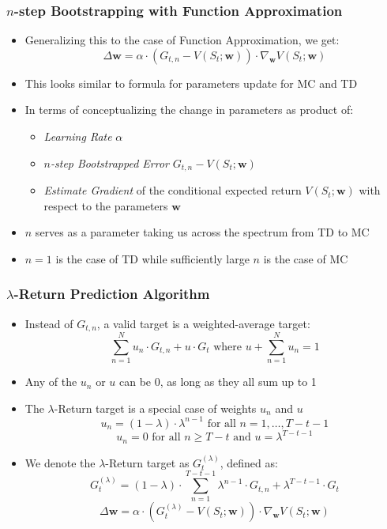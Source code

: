 \documentclass[handout]{beamer}
\begin{document}
\begin{frame}
\frametitle{$n$-step Bootstrapping with Function Approximation}
\pause
\begin{itemize}[<+->]
\item Generalizing this to the case of Function Approximation, we get:
$$\Delta \bm{w} = \alpha \cdot (G_{t,n} - V(S_t; \bm{w})) \cdot \nabla_{\bm{w}} V(S_t;\bm{w})$$
\item This looks similar to formula for parameters update for MC and TD
\item In terms of conceptualizing the change in parameters as product of:
\begin{itemize}[<+->]
\item {\em Learning Rate} $\alpha$
\item {\em $n$-step Bootstrapped Error} $G_{t,n} - V(S_t; \bm{w})$
\item {\em Estimate Gradient} of the conditional expected return $V(S_t;\bm{w})$ with respect to the parameters $\bm{w}$
\end{itemize}
\item $n$ serves as a parameter taking us across the spectrum from TD to MC
\item $n=1$ is the case of TD while sufficiently large $n$ is the case of MC
\end{itemize}
\end{frame}

\begin{frame}
\frametitle{$\lambda$-Return Prediction Algorithm}
\pause
\begin{itemize}[<+->]
\item Instead of $G_{t,n}$, a valid target is a weighted-average target:
$$\sum_{n=1}^N u_n \cdot G_{t,n} + u \cdot G_t \text{ where } u + \sum_{n=1}^N u_n = 1$$
\item Any of the $u_n$ or $u$ can be 0, as long as they all sum up to 1
\item The $\lambda$-Return target is a special case of weights $u_n$ and $u$
$$u_n = (1 - \lambda) \cdot \lambda^{n-1} \text{ for all } n = 1, \ldots, T-t-1$$
$$u_n = 0 \text{ for all } n \geq T-t \text{ and } u = \lambda^{T-t-1}$$
\item We denote the $\lambda$-Return target as $G_t^{(\lambda)}$, defined as:
$$G_t^{(\lambda)} = (1-\lambda) \cdot \sum_{n=1}^{T-t-1} \lambda^{n-1} \cdot G_{t,n} + \lambda^{T-t-1} \cdot G_t$$
$$\Delta \bm{w} = \alpha \cdot (G_t^{(\lambda)} - V(S_t; \bm{w})) \cdot \nabla_{\bm{w}} V(S_t;\bm{w})$$
\end{itemize}
\end{frame}
\end{document}
